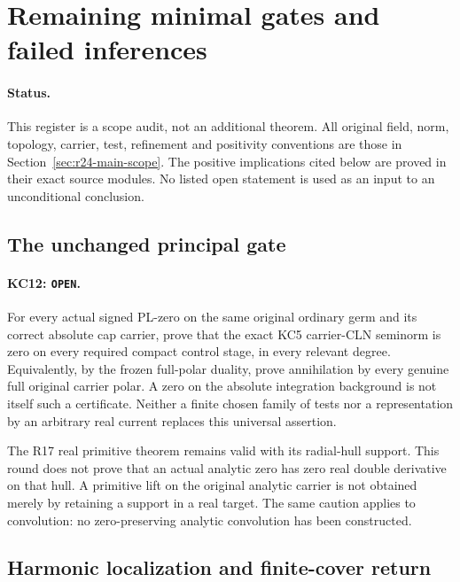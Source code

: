 \section{Remaining minimal gates and failed inferences}
\label{sec:r24-remaining-gates}

\paragraph{Status.}
This register is a scope audit, not an additional theorem.
All original field, norm, topology, carrier, test, refinement and
positivity conventions are those in Section~\ref{sec:r24-main-scope}.
The positive implications cited below are proved in their exact
source modules.  No listed open statement is used as an input to
an unconditional conclusion.

\subsection{The unchanged principal gate}

\paragraph{KC12: \texttt{OPEN}.}
For every actual signed PL-zero on the same original ordinary
germ and its correct absolute cap carrier, prove that the exact
KC5 carrier-CLN seminorm is zero on every required compact control
stage, in every relevant degree.  Equivalently, by the frozen
full-polar duality, prove annihilation by every genuine full
original carrier polar.  A zero on the absolute integration
background is not itself such a certificate.  Neither a finite
chosen family of tests nor a representation by an arbitrary real
current replaces this universal assertion.

The R17 real primitive theorem remains valid with its radial-hull
support.  This round does not prove that an actual analytic zero
has zero real double derivative on that hull.  A primitive lift
on the original analytic carrier is not obtained merely by
retaining a support in a real target.  The same caution applies
to convolution: no zero-preserving analytic convolution has
been constructed.

\subsection{Harmonic localization and finite-cover return}

